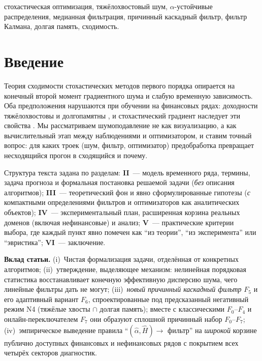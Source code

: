 \documentclass[conference]{IEEEtran}
\theoremstyle{plain}
\theoremstyle{definition}
\begin{document}
\begin{IEEEkeywords}
стохастическая оптимизация, тяжёлохвостовый шум, $\alpha$-устойчивые
распределения, медианная фильтрация, причинный каскадный фильтр,
фильтр Калмана, долгая память, сходимость.
\end{IEEEkeywords}

\section{Введение}

Теория сходимости стохастических методов первого порядка опирается на
конечный второй момент градиентного шума и слабую временную зависимость.
Оба предположения нарушаются при обучении на финансовых рядах:
доходности тяжёлохвостовы и долгопамятны
\cite{cont2001,mandelbrot1963}, и стохастический градиент
наследует эти свойства \cite{simsekli2019tailindex}. Мы рассматриваем
шумоподавление не как визуализацию, а как вычислительный этап между
наблюдениями и оптимизатором, и ставим точный вопрос: для каких троек
(шум, фильтр, оптимизатор) предобработка превращает несходящийся
прогон в сходящийся и почему.

Структура текста задана по разделам:
\textbf{II}~--- модель временного ряда, термины, задача прогноза и
формальная постановка решаемой задачи (\emph{без} описания алгоритмов);
\textbf{III}~--- теоретический фон и явно сформулированные гипотезы
(\emph{с} компактными определениями фильтров и оптимизаторов как
аналитических объектов);
\textbf{IV}~--- экспериментальный план, расширенная корзина реальных
доменов (включая нефинансовые) и анализ;
\textbf{V}~--- практические критерии выбора, где каждый пункт явно
помечен как ``из теории'', ``из эксперимента'' или ``эвристика'';
\textbf{VI}~--- заключение.

\textbf{Вклад статьи.} (i)~Чистая формализация задачи, отделённая от
конкретных алгоритмов; (ii)~утверждение, выделяющее механизм:
нелинейная порядковая статистика восстанавливает конечную эффективную
дисперсию шума, чего линейные фильтры дать не могут;
(iii)~\emph{новый причинный каскадный фильтр} $F_5$ и его адаптивный
вариант $F_6$, спроектированные под предсказанный негативный режим
N4 (тяжёлые хвосты $\cap$ долгая память); вместе с классическими
$F_0$--$F_4$ и онлайн-переключателем $F_7$ они образуют сплошной
причинный набор $F_0$--$F_7$; (iv)~эмпирическое выведение правила
``$(\hat\alpha,\hat H)\to$ фильтр'' на \emph{широкой} корзине публично
доступных финансовых и нефинансовых рядов с покрытием всех четырёх
секторов диагностик.
\end{document}
